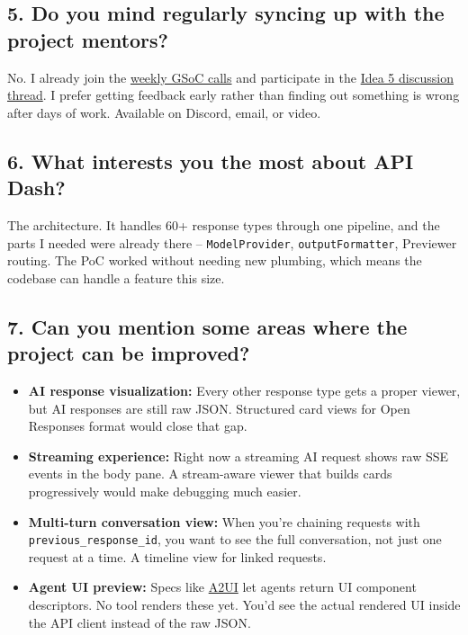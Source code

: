 \documentclass[11pt,a4paper]{article}
\begin{document}
\subsection{5. Do you mind regularly syncing up with the project mentors?}

No. I already join the \href{https://lu.ma/calendar/cal-ZTW02O2EsWRs6V4}{weekly GSoC calls} and participate in the \href{https://github.com/foss42/apidash/discussions/1227}{Idea 5 discussion thread}. I prefer getting feedback early rather than finding out something is wrong after days of work. Available on Discord, email, or video.

\subsection{6. What interests you the most about API Dash?}

The architecture. It handles 60+ response types through one pipeline, and the parts I needed were already there -- \texttt{ModelProvider}, \texttt{outputFormatter}, Previewer routing. The PoC worked without needing new plumbing, which means the codebase can handle a feature this size.

\subsection{7. Can you mention some areas where the project can be improved?}

\begin{itemize}
  \item \textbf{AI response visualization:} Every other response type gets a proper viewer, but AI responses are still raw JSON. Structured card views for Open Responses format would close that gap.

  \item \textbf{Streaming experience:} Right now a streaming AI request shows raw SSE events in the body pane. A stream-aware viewer that builds cards progressively would make debugging much easier.

  \item \textbf{Multi-turn conversation view:} When you're chaining requests with \texttt{previous\_response\_id}, you want to see the full conversation, not just one request at a time. A timeline view for linked requests.

  \item \textbf{Agent UI preview:} Specs like \href{https://github.com/google/A2UI}{A2UI} let agents return UI component descriptors. No tool renders these yet. You'd see the actual rendered UI inside the API client instead of the raw JSON.
\end{itemize}
\end{document}
